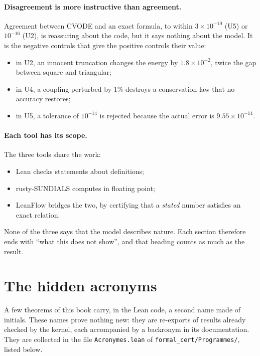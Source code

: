 \paragraph{Disagreement is more instructive than agreement.} Agreement between CVODE and an exact formula, to within
$3\times10^{-10}$ (U5) or $10^{-16}$ (U2), is reassuring about the code, but it says nothing about the model. It is
the negative controls that give the positive controls their value:
\begin{itemize}
\item in U2, an innocent truncation changes the energy by $1.8\times10^{-2}$, twice the gap between square and
triangular;
\item in U4, a coupling perturbed by 1\% destroys a conservation law that no accuracy restores;
\item in U5, a tolerance of $10^{-14}$ is rejected because the actual error is $9.55\times10^{-14}$.
\end{itemize}

\paragraph{Each tool has its scope.} The three tools share the work:
\begin{itemize}
\item Lean checks statements about definitions;
\item rusty-SUNDIALS computes in floating point;
\item LeanFlow bridges the two, by certifying that a \emph{stated} number satisfies an exact relation.
\end{itemize}
None of the three says that the model describes nature. Each section therefore ends with ``what this does not
show'', and that heading counts as much as the result.

\section{The hidden acronyms}\label{ch5:acronymes}

A few theorems of this book carry, in the Lean code, a second name made of initials. These names
prove nothing new: they are re-exports of results already checked by the kernel, each accompanied
by a backronym in its documentation. They are collected in
the file \texttt{Acronymes.lean} of \texttt{formal\_cert/Programmes/}, listed below.

